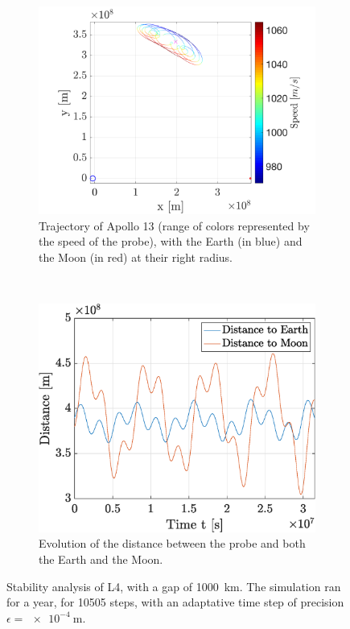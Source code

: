 \documentclass[a4paper,12pt,twoside]{article}
\begin{document}
\begin{figure}[h]
  \centering
  \begin{subfigure}[t]{0.55\textwidth}
    \includegraphics[width=\textwidth]{graphs/ex6b_traj.png}
    \caption{Trajectory of Apollo 13 (range of colors represented by the speed of the probe), with the Earth (in blue) and the Moon (in red) at their right radius.}
    \label{fig:6b_traj}
  \end{subfigure}
  ~
  \begin{subfigure}[t]{0.4\textwidth}
    \includegraphics[width=\textwidth]{graphs/ex6b_dist.eps}
    \caption{Evolution of the distance between the probe and both the Earth and the Moon.}
    \label{fig:6b_dist}
  \end{subfigure}
  \caption{Stability analysis of L4, with a gap of \SI{1000}{\km}. The simulation ran for a year, for \num{10505} steps, with an adaptative time step of precision $\epsilon = \SI{e-4}{\m}$.}
  \label{fig:6b_stab}
\end{figure}
\end{document}
